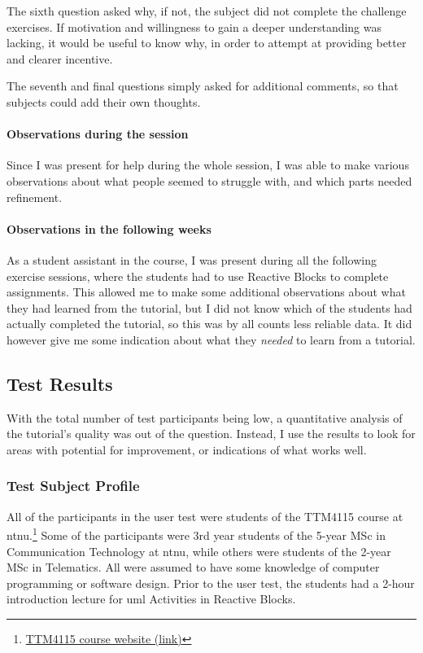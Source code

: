 \noindent
The sixth question asked why, if not, the subject did not complete the challenge exercises. If motivation and willingness to gain a deeper understanding was lacking, it would be useful to know why, in order to attempt at providing better and clearer incentive.

\noindent
The seventh and final questions simply asked for additional comments, so that subjects could add their own thoughts.

\paragraph{Observations during the session} Since I was present for help during the whole session, I was able to make various observations about what people seemed to struggle with, and which parts needed refinement.

\paragraph{Observations in the following weeks} As a student assistant in the course, I was present during all the following exercise sessions, where the students had to use Reactive Blocks to complete assignments. This allowed me to make some additional observations about what they had learned from the tutorial, but I did not know which of the students had actually completed the tutorial, so this was by all counts less reliable data. It did however give me some indication about what they \emph{needed} to learn from a tutorial.

\subsection{Test Results}
\label{sec:tutorial_test_results}
With the total number of test participants being low, a quantitative analysis of the tutorial's quality was out of the question. Instead, I use the results to look for areas with potential for improvement, or indications of what works well.

\subsubsection{Test Subject Profile}
All of the participants in the user test were students of the TTM4115 course at \gls{ntnu}.\footnote{\href{http://www.item.ntnu.no/academics/courses/ttm4115/start}{TTM4115 course website (link)}} Some of the participants were 3rd year students of the 5-year MSc in Communication Technology at \gls{ntnu}, while others were students of the 2-year MSc in Telematics. All were assumed to have some knowledge of computer programming or software design. Prior to the user test, the students had a 2-hour introduction lecture for \gls{uml} Activities in Reactive Blocks.

